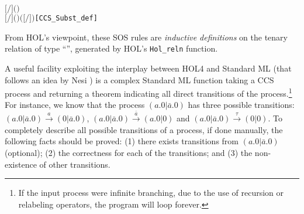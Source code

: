 \begin{alltt}
    \ensuremath{[}\ensuremath{/}\ensuremath{]} \ensuremath{(} \ensuremath{)} \HOLSymConst{\HOLTokenDefEquality{}}   \HOLSymConst{\ensuremath{=}}      
    \ensuremath{[}\ensuremath{/}\ensuremath{]} \ensuremath{(}  \ensuremath{)} \HOLSymConst{\HOLTokenDefEquality{}}   \HOLSymConst{\ensuremath{=}}         \ensuremath{(}\ensuremath{[}\ensuremath{/}\ensuremath{]} \ensuremath{)}\hfill{[CCS_Subst_def]}
\end{alltt}

From HOL's viewpoint, these
SOS rules are \emph{inductive
  definitions} on the tenary relation  of type ``'', generated by HOL's
\texttt{Hol_reln} function.

A useful facility exploiting the interplay
between HOL4 and Standard ML (that follows an idea by Nesi \cite{Nesi:1992ve})
 is a complex Standard ML function
  taking a CCS process and returning a theorem indicating all
  direct transitions of the process.\footnote{If the input process were
 infinite branching, due to the use of recursion or
    relabeling operators, the program will loop forever.}
For instance, we know that the process $(a.0 | \bar{a}.0)$ has three
possible transitions: $(a.0 | \bar{a}.0) \overset{a}{\longrightarrow}
(0 | \bar{a}.0)$, $(a.0 | \bar{a}.0)
\overset{\bar{a}}{\longrightarrow} (a.0 | 0)$ and $(a.0 | \bar{a}.0)
\overset{\tau}{\longrightarrow} (0 | 0)$.
To completely describe all possible transitions of a process, if done manually, the
following facts should be proved: (1) there exists transitions from
$(a.0 | \bar{a}.0)$ (optional); (2) the correctness for each of the
transitions; and (3) the non-existence of other transitions.

